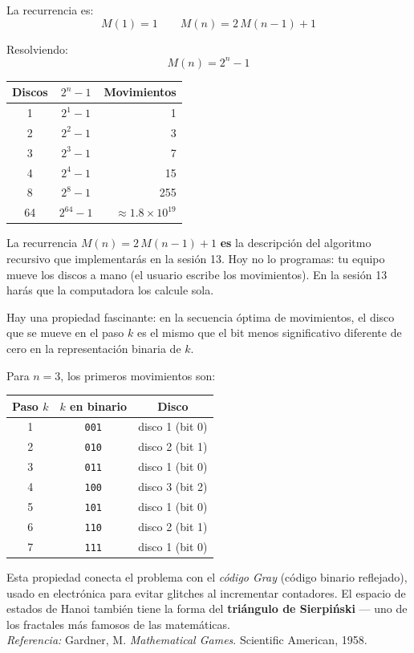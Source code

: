 \documentclass[12pt, oneside]{article}
\begin{document}
La recurrencia es:
\[
  M(1) = 1 \qquad M(n) = 2\,M(n-1) + 1
\]

Resolviendo:
\[
  M(n) = 2^n - 1
\]

\begin{center}
\begin{tabular}{ccr}
  \toprule
  \textbf{Discos} & \textbf{$2^n - 1$} & \textbf{Movimientos} \\
  \midrule
  1 & $2^1 - 1$ & 1 \\
  2 & $2^2 - 1$ & 3 \\
  3 & $2^3 - 1$ & 7 \\
  4 & $2^4 - 1$ & 15 \\
  8 & $2^8 - 1$ & 255 \\
  64 & $2^{64} - 1$ & $\approx 1.8 \times 10^{19}$ \\
  \bottomrule
\end{tabular}
\end{center}

\begin{recuerda}
  La recurrencia $M(n) = 2\,M(n-1) + 1$ \textbf{es} la descripción del
  algoritmo recursivo que implementarás en la sesión 13.
  Hoy no lo programas: tu equipo mueve los discos a mano (el usuario
  escribe los movimientos).  En la sesión 13 harás que la computadora
  los calcule sola.
\end{recuerda}

\begin{tecnico}
  Hay una propiedad fascinante: en la secuencia óptima de movimientos,
  el disco que se mueve en el paso $k$ es el mismo que el bit menos
  significativo diferente de cero en la representación binaria de $k$.

  Para $n=3$, los primeros movimientos son:
  \begin{center}
  \begin{tabular}{ccc}
    \toprule
    \textbf{Paso $k$} & \textbf{$k$ en binario} & \textbf{Disco} \\
    \midrule
    1 & \texttt{001} & disco 1 (bit 0) \\
    2 & \texttt{010} & disco 2 (bit 1) \\
    3 & \texttt{011} & disco 1 (bit 0) \\
    4 & \texttt{100} & disco 3 (bit 2) \\
    5 & \texttt{101} & disco 1 (bit 0) \\
    6 & \texttt{110} & disco 2 (bit 1) \\
    7 & \texttt{111} & disco 1 (bit 0) \\
    \bottomrule
  \end{tabular}
  \end{center}
  Esta propiedad conecta el problema con el \textit{código Gray}
  (código binario reflejado), usado en electrónica para evitar glitches
  al incrementar contadores.  El espacio de estados de Hanoi también
  tiene la forma del \textbf{triángulo de Sierpiński} — uno de los
  fractales más famosos de las matemáticas.\\
  \textit{Referencia:} Gardner, M. \textit{Mathematical Games}.
  Scientific American, 1958.
\end{tecnico}
\end{document}
